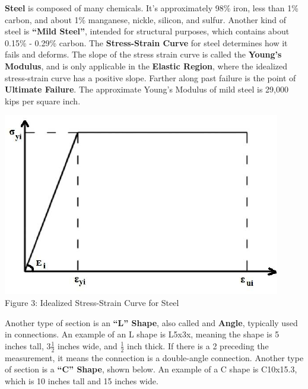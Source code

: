 \documentclass{article}
\begin{document}
\newpage
\noindent \textbf{Steel} is composed of many chemicals. It's approximately 98\% iron, less than 1\% carbon, and about 1\% manganese, nickle, silicon, and sulfur. Another kind of steel is \textbf{``Mild Steel''}, intended for structural purposes, which contains about 0.15\% - 0.29\% carbon. The \textbf{Stress-Strain Curve} for steel determines how it fails and deforms. The slope of the stress strain curve is called the \textbf{Young's Modulus}, and is only applicable in the \textbf{Elastic Region}, where the idealized stress-strain curve has a positive slope. Farther along past failure is the point of \textbf{Ultimate Failure}. The approximate Young's Modulus of mild steel is 29,000 kips per square inch.
\begin{center}
    \vspace{3mm}
    \includegraphics[scale=0.5]{fig3.png}
    \vspace{3mm}
    \\Figure 3: Idealized Stress-Strain Curve for Steel
\end{center}
\noindent Another type of section is an \textbf{``L'' Shape}, also called and \textbf{Angle}, typically used in connections. An example of an L shape is L5x3\textonehalf x\textonehalf, meaning the shape is 5 inches tall, 3\(\frac{1}{2}\) inches wide, and \(\frac{1}{2}\) inch thick. If there is a 2 preceding the measurement, it means the connection is a double-angle connection. Another type of section is a \textbf{``C'' Shape}, shown below. An example of a C shape is C10x15.3, which is 10 inches tall and 15 inches wide.
\end{document}
